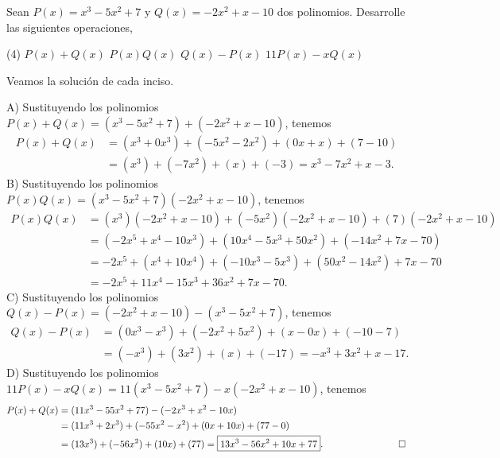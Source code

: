 \begin{example}
    Sean $P(x) = x^3 - 5x^2 + 7$ y $Q(x) = -2x^2 + x - 10$ dos polinomios.
    Desarrolle las siguientes operaciones,
    \begin{tasks}(4)
        \task $P(x) + Q(x)$
        \task $P(x) Q(x)$
        \task $Q(x) - P(x)$
        \task $11 P(x) - x Q(x)$
    \end{tasks}
\end{example}
\begin{solution}
    Veamos la solución de cada inciso.

    A) Sustituyendo los polinomios $P(x) + Q(x) = (x^3 - 5x^2 + 7) + (-2x^2 + x - 10)$, tenemos
    \begin{align*}
        P(x) + Q(x) &= (x^3 + 0x^3) + (-5 x^2 - 2x^2) + (0x + x) + (7 - 10)\\
        &= (x^3) + (-7x^2) + (x) + (-3) = \boxed{x^3 - 7x^2 + x - 3}.
    \end{align*}
    B) Sustituyendo los polinomios $P(x) Q(x) = (x^3 - 5x^2 + 7)(-2x^2 + x - 10)$, tenemos
    \begin{align*}
        P(x) Q(x) &= (x^3)(-2x^2 + x - 10) + (-5x^2)(-2x^2 + x - 10) + (7)(-2x^2 + x - 10)\\
        &= (-2x^5 + x^4 - 10x^3) + (10x^4 - 5x^3 + 50x^2) + (-14x^2 + 7x - 70)\\
        &= -2x^5 + (x^4 + 10x^4) + ( - 10x^3 - 5x^3) + (50x^2 -14x^2) + 7x - 70\\
        &= \boxed{-2x^5 + 11x^4 - 15x^3 + 36x^2 + 7x - 70}.
    \end{align*}
    C) Sustituyendo los polinomios $Q(x) - P(x) = (-2x^2 + x - 10) - (x^3 - 5x^2 + 7)$, tenemos
    \begin{align*}
        Q(x) - P(x) &= (0x^3 - x^3) + (- 2x^2 + 5 x^2) + (x - 0x) + (- 10 - 7)\\
        &= (-x^3) + (3x^2) + (x) + (-17) = \boxed{-x^3 + 3x^2 + x - 17}.
    \end{align*}
    D) Sustituyendo los polinomios $11P(x) - xQ(x) = 11(x^3 - 5x^2 + 7) - x(-2x^2 + x - 10)$, tenemos
    \begin{align*}
        P(x) + Q(x) &= (11x^3 - 55x^2 + 77) - (-2x^3 + x^2 - 10x)\\
        &= (11x^3 + 2x^3) + (-55 x^2 - x^2) + (0x + 10x) + (77 - 0)\\
        &= (13x^3) + (-56x^2) + (10x) + (77) = \boxed{13x^3 - 56x^2 + 10x + 77}.\qquad\qquad\qquad\qedhere
    \end{align*}
\end{solution}

